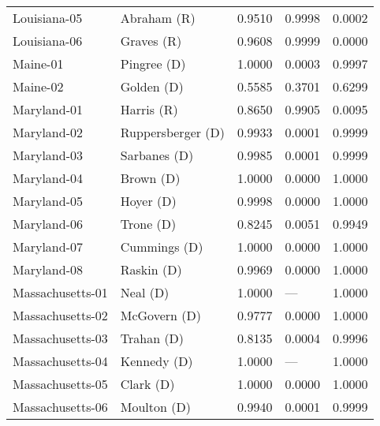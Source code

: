 \begin{longtable}{llrll}
      Louisiana-05 &           {\color{Red} Abraham (R)} &       0.9510 &        0.9998 &        0.0002 \\
      Louisiana-06 &            {\color{Red} Graves (R)} &       0.9608 &        0.9999 &        0.0000 \\
          Maine-01 &          {\color{Blue} Pingree (D)} &       1.0000 &        0.0003 &        0.9997 \\
          Maine-02 &           {\color{Blue} Golden (D)} &       0.5585 &        0.3701 &        0.6299 \\
       Maryland-01 &            {\color{Red} Harris (R)} &       0.8650 &        0.9905 &        0.0095 \\
       Maryland-02 &    {\color{Blue} Ruppersberger (D)} &       0.9933 &        0.0001 &        0.9999 \\
       Maryland-03 &         {\color{Blue} Sarbanes (D)} &       0.9985 &        0.0001 &        0.9999 \\
       Maryland-04 &            {\color{Blue} Brown (D)} &       1.0000 &        0.0000 &        1.0000 \\
       Maryland-05 &            {\color{Blue} Hoyer (D)} &       0.9998 &        0.0000 &        1.0000 \\
       Maryland-06 &            {\color{Blue} Trone (D)} &       0.8245 &        0.0051 &        0.9949 \\
       Maryland-07 &         {\color{Blue} Cummings (D)} &       1.0000 &        0.0000 &        1.0000 \\
       Maryland-08 &           {\color{Blue} Raskin (D)} &       0.9969 &        0.0000 &        1.0000 \\
  Massachusetts-01 &             {\color{Blue} Neal (D)} &       1.0000 &           --- &        1.0000 \\
  Massachusetts-02 &         {\color{Blue} McGovern (D)} &       0.9777 &        0.0000 &        1.0000 \\
  Massachusetts-03 &           {\color{Blue} Trahan (D)} &       0.8135 &        0.0004 &        0.9996 \\
  Massachusetts-04 &          {\color{Blue} Kennedy (D)} &       1.0000 &           --- &        1.0000 \\
  Massachusetts-05 &            {\color{Blue} Clark (D)} &       1.0000 &        0.0000 &        1.0000 \\
  Massachusetts-06 &          {\color{Blue} Moulton (D)} &       0.9940 &        0.0001 &        0.9999 \\

\end{longtable}

